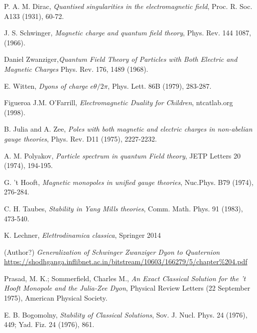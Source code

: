 \clearpage
{}
{}


\begin{thebibliography}{99}


P. A. M. Dirac,
\emph{Quantised singularities in the electromagnetic field}, Proc. R. Soc. A133 (1931), 60-72.

J. S. Schwinger, \emph{Magnetic charge and quantum field theory}, Phys. Rev. 144 1087, (1966).

Daniel Zwanziger,\emph{Quantum Field Theory of Particles with Both Electric and Magnetic Charges} Phys. Rev. 176, 1489 (1968).

E. Witten,
\emph{Dyons of charge $e\theta/2\pi$}, Phys. Lett. 86B (1979), 283-287.

Figueroa J.M. O'Farrill, \emph{Electromagnetic Duality for Children}, ntcatlab.org
(1998).

B. Julia and A. Zee, \emph{Poles with both magnetic and electric charges
in non-abelian gauge theories}, Phys. Rev. D11 (1975), 2227-2232.

A. M. Polyakov, \emph{Particle spectrum in quantum Field theory}, JETP Letters 20 (1974), 194-195.

G. 't Hooft, \emph{Magnetic monopoles in unified gauge theories}, Nuc.Phys. B79 (1974), 276-284.

C. H. Taubes, \emph{Stability in Yang Mills theories}, Comm. Math.
Phys. 91 (1983), 473-540.

K. Lechner, \emph{Elettrodinamica classica}, Springer 2014

(Author?) \emph{Generalization of Schwinger Zwanziger Dyon to Quaternion}
\url{https://shodhganga.inflibnet.ac.in/bitstream/10603/166279/5/chapter\%204.pdf}

 Prasad, M. K.; Sommerfield, Charles M., \emph{An Exact Classical Solution for the 't Hooft Monopole and the Julia-Zee Dyon}, Physical Review Letters (22 September 1975), American Physical Society.

E. B. Bogomolny, \emph{Stability of Classical Solutions}, Sov. J. Nucl. Phys. 24 (1976), 449; Yad. Fiz. 24 (1976), 861.

\end{thebibliography}